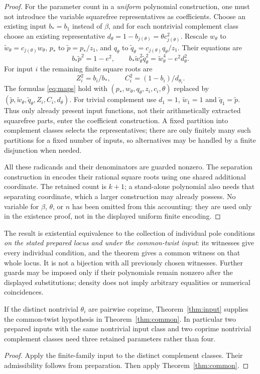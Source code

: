 \documentclass[11pt,a4paper]{article}
\theoremstyle{definition}\newtheorem{definition}[theorem]{Definition}
\theoremstyle{remark}\newtheorem{remark}[theorem]{Remark}
\begin{document}
\begin{proof}
For the parameter count in a \emph{uniform} polynomial construction,
one must not introduce the variable squarefree representatives as
coefficients. Choose an existing input $b_*=b_1$ instead of $\beta$,
and for each nontrivial complement class choose an existing representative
$d_\theta=1-b_{j(\theta)}=\theta c_{j(\theta)}^2$.
Rescale $w_\theta$ to $\widetilde w_\theta=c_{j(\theta)}w_\theta$,
$p_*$ to $\widetilde p=p_*/z_1$, and $q_\theta$ to
$\widetilde q_\theta=c_{j(\theta)}q_\theta/z_1$. Their equations are
\[
 b_*\widetilde p^2=1-e^2,\qquad
 b_*\widetilde w_\theta^2\widetilde q_\theta^2
       =\widetilde w_\theta^4-e^2d_\theta^2.
\]
For input $i$ the remaining finite square roots are
\[
 Z_i^2=b_i/b_*,\qquad C_i^2=(1-b_i)/d_{\theta_i}.
\]
The formulas \eqref{eq:maps} hold with
$(p_*,w_\theta,q_\theta,z_i,c_i,\theta)$ replaced by
$(\widetilde p,\widetilde w_\theta,\widetilde q_\theta,Z_i,C_i,d_\theta)$.
For trivial complement use $d_1=1$, $\widetilde w_1=1$ and
$\widetilde q_1=\widetilde p$. Thus only already present input
functions, not their arithmetically extracted squarefree parts, enter
the coefficient construction. A fixed partition into complement classes
selects the representatives; there are only finitely many such partitions
for a fixed number of inputs, so alternatives may be handled by a finite
disjunction when needed.

All these radicands and their denominators are guarded nonzero. The
separation construction in \cite{Joint} encodes their rational square
roots using one shared additional coordinate. The retained count is
$k+1$; a stand-alone polynomial also needs that separating coordinate,
which a larger construction may already possess. No variable for
$\beta$, $\theta$, or $n$ has been omitted from this accounting: they
are used only in the existence proof, not in the displayed uniform
finite encoding.
\end{proof}

The result is existential equivalence to the collection of individual
pole conditions \emph{on the stated prepared locus and under the common-twist
input}: its witnesses give every individual condition, and the theorem
gives a common witness on that whole locus. It is not a bijection with
all previously chosen witnesses. Further guards may be imposed only if
their polynomials remain nonzero after the displayed substitutions;
density does not imply arbitrary equalities or numerical coincidences.

\begin{corollary}\label{cor:coprime}
If the distinct nontrivial $\theta_i$ are pairwise coprime,
Theorem~\ref{thm:input} supplies the common-twist hypothesis in
Theorem~\ref{thm:common}. In particular two prepared inputs with the
same nontrivial input class and two coprime nontrivial complement
classes need three retained parameters rather than four.
\end{corollary}
\begin{proof}
Apply the finite-family input to the distinct complement classes.
Their admissibility follows from preparation. Then apply
Theorem~\ref{thm:common}.
\end{proof}
\end{document}
